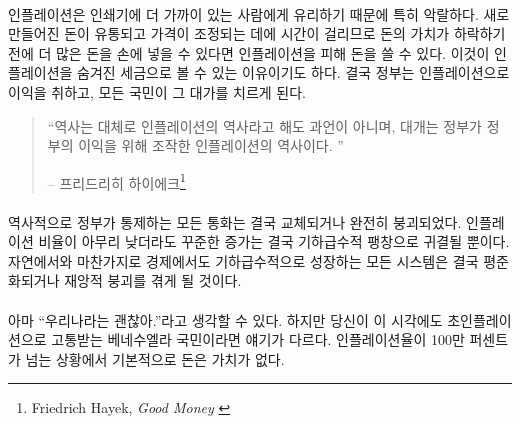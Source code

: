 \paragraph{}
인플레이션은 인쇄기에 더 가까이 있는 사람에게 유리하기 때문에 특히 악랄하다. 
새로 만들어진 돈이 유통되고 가격이 조정되는 데에 시간이 걸리므로 
돈의 가치가 하락하기 전에 더 많은 돈을 손에 넣을 수 있다면 인플레이션을 피해 돈을 쓸 수 있다. 
이것이 인플레이션을 숨겨진 세금으로 볼 수 있는 이유이기도 하다.
결국 정부는 인플레이션으로 이익을 취하고, 모든 국민이 그 대가를 치르게 된다.

\begin{quotation}\begin{samepage}
		\enquote{역사는 대체로 인플레이션의 역사라고 해도 과언이 아니며, 대개는 정부가 정부의 이익을 위해 조작한 인플레이션의 역사이다. }
		\begin{flushright} -- 프리드리히 하이에크\footnote{Friedrich Hayek, \textit{Good Money} \cite{hayek-good-money}}
\end{flushright}\end{samepage}\end{quotation}

\paragraph{}
역사적으로 정부가 통제하는 모든 통화는 결국 교체되거나 완전히 붕괴되었다. 
인플레이션 비율이 아무리 낮더라도 꾸준한 증가는 결국 기하급수적 팽창으로 귀결될 뿐이다. 
자연에서와 마찬가지로 경제에서도 기하급수적으로 성장하는 
모든 시스템은 결국 평준화되거나 재앙적 붕괴를 겪게 될 것이다.

\paragraph{}
아마 \enquote{우리나라는 괜찮아.}라고 생각할 수 있다.
하지만 당신이 이 시각에도 초인플레이션으로 고통받는 베네수엘라 국민이라면 얘기가 다르다.  
인플레이션율이 100만 퍼센트가 넘는 상황에서 기본적으로 돈은 가치가 없다.\cite{wiki:venezuela}

